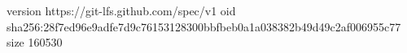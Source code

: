 version https://git-lfs.github.com/spec/v1
oid sha256:28f7ed96e9adfe7d9c76153128300bbfbeb0a1a038382b49d49c2af006955c77
size 160530
